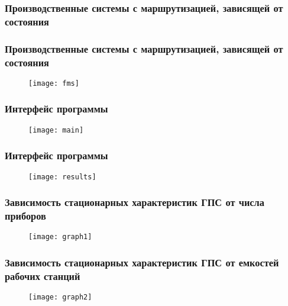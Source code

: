 
\begin{frame} \frametitle{Производственные системы с маршрутизацией, зависящей от состояния}

\end{frame}


\begin{frame} \frametitle{Производственные системы с маршрутизацией, зависящей от состояния}
\begin{figure}[H]
  \centering
  \texttt{[image: fms]}
  \label{fig:main}
\end{figure}
\end{frame}


\begin{frame} \frametitle{Интерфейс программы}
\begin{figure}[H]
  \centering
  \texttt{[image: main]}
  \label{fig:main}
\end{figure}
\end{frame}


\begin{frame} \frametitle{Интерфейс программы}
\begin{figure}[H]
  \centering
  \texttt{[image: results]}
  \label{fig:main}
\end{figure}
\end{frame}


\begin{frame} \frametitle{Зависимость стационарных характеристик ГПС от числа приборов}
\begin{figure}[H]
  \centering
  \texttt{[image: graph1]}
  \label{fig:main}
\end{figure}
\end{frame}


\begin{frame} \frametitle{Зависимость стационарных характеристик ГПС от емкостей рабочих станций}
\begin{figure}[H]
  \centering
  \texttt{[image: graph2]}
  \label{fig:main}
\end{figure}
\end{frame}

